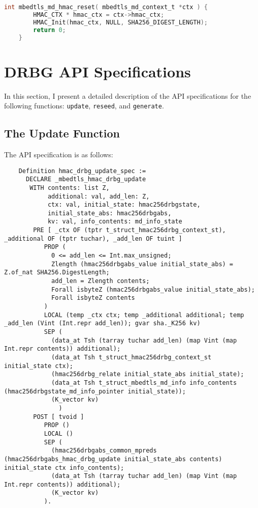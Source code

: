 \documentclass[pageno]{jpaper}
\begin{document}
\begin{lstlisting}[language=C]
    int mbedtls_md_hmac_reset( mbedtls_md_context_t *ctx ) {
        HMAC_CTX * hmac_ctx = ctx->hmac_ctx;
        HMAC_Init(hmac_ctx, NULL, SHA256_DIGEST_LENGTH);
        return 0;
    }
\end{lstlisting}
\section{DRBG API Specifications} \label{appendix_api}
In this section, I present a detailed description of the API specifications for the following functions: \lstinline{update}, \lstinline{reseed}, and \lstinline{generate}.

\subsection{The Update Function}

The API specification is as follows:

\begin{lstlisting}
    Definition hmac_drbg_update_spec :=
      DECLARE _mbedtls_hmac_drbg_update
       WITH contents: list Z,
            additional: val, add_len: Z,
            ctx: val, initial_state: hmac256drbgstate,
            initial_state_abs: hmac256drbgabs,
            kv: val, info_contents: md_info_state
        PRE [ _ctx OF (tptr t_struct_hmac256drbg_context_st), _additional OF (tptr tuchar), _add_len OF tuint ]
           PROP (
             0 <= add_len <= Int.max_unsigned;
             Zlength (hmac256drbgabs_value initial_state_abs) = Z.of_nat SHA256.DigestLength;
             add_len = Zlength contents;
             Forall isbyteZ (hmac256drbgabs_value initial_state_abs);
             Forall isbyteZ contents
           )
           LOCAL (temp _ctx ctx; temp _additional additional; temp _add_len (Vint (Int.repr add_len)); gvar sha._K256 kv)
           SEP (
             (data_at Tsh (tarray tuchar add_len) (map Vint (map Int.repr contents)) additional);
             (data_at Tsh t_struct_hmac256drbg_context_st initial_state ctx);
             (hmac256drbg_relate initial_state_abs initial_state);
             (data_at Tsh t_struct_mbedtls_md_info info_contents (hmac256drbgstate_md_info_pointer initial_state));
             (K_vector kv)
               )
        POST [ tvoid ]
           PROP ()
           LOCAL ()
           SEP (
             (hmac256drbgabs_common_mpreds (hmac256drbgabs_hmac_drbg_update initial_state_abs contents) initial_state ctx info_contents);
             (data_at Tsh (tarray tuchar add_len) (map Vint (map Int.repr contents)) additional);
             (K_vector kv)
           ).
\end{lstlisting}
\end{document}
